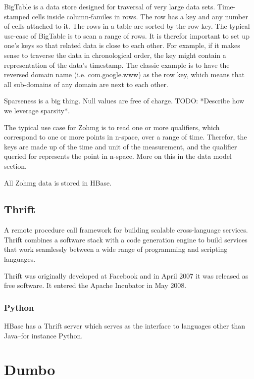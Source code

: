 \documentclass[a4paper,10pt]{book}
\begin{document}
BigTable is a data store designed for traversal of very large data sets.  Time-stamped cells inside column-familes in rows. The row has a key and any number of cells attached to it. The rows in a table are sorted by the row key.  The typical use-case of BigTable is to scan a range of rows. It is therefor important to set up one's keys so that related data is close to each other. For example, if it makes sense to traverse the data in chronological order, the key might contain a representation of the data's timestamp. The classic example is to have the reversed domain name (i.e.  com.google.www) as the row key, which means that all sub-domains of any domain are next to each other.

Sparseness is a big thing. Null values are free of charge. TODO: *Describe how we leverage sparsity*.

The typical use case for Zohmg is to read one or more qualifiers, which correspond to one or more points in n-space, over a range of time.  Therefor, the keys are made up of the time and unit of the measurement, and the qualifier queried for represents the point in n-space. More on this in the data model section.

All Zohmg data is stored in HBase.


\subsection{Thrift}

A remote procedure call framework for building scalable cross-language
services. Thrift combines a software stack with a code generation engine to
build services that work seamlessly between a wide range of programming and
scripting languages. \cite{thrift}

Thrift was originally developed at Facebook and in April 2007 it was
released as free software. It entered the Apache Incubator in May 2008.


\subsubsection{Python}

HBase has a Thrift server which serves as the interface to languages other
than Java--for instance Python.



\section{Dumbo}
\end{document}
